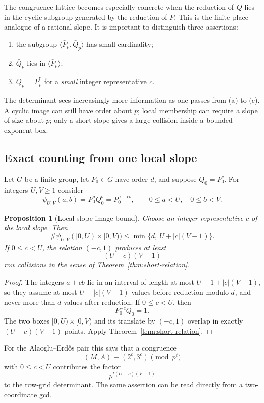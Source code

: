 \documentclass[11pt]{article}
\newtheorem{proposition}[theorem]{Proposition}
\theoremstyle{definition}
\theoremstyle{remark}
\begin{document}
The congruence lattice becomes especially concrete when the reduction of $Q$ lies in the cyclic subgroup generated by the reduction of $P$.  This is the finite-place analogue of a rational slope.  It is important to distinguish three assertions:
\begin{enumerate}[label=\textup{(\alph*)}]
\item the subgroup $\langle\bar P_p,\bar Q_p\rangle$ has small cardinality;
\item $\bar Q_p$ lies in $\langle\bar P_p\rangle$;
\item $\bar Q_p=\bar P_p^c$ for a \emph{small} integer representative $c$.
\end{enumerate}
The determinant sees increasingly more information as one passes from (a) to (c).  A cyclic image can still have order about $p$; local membership can require a slope of size about $p$; only a short slope gives a large collision inside a bounded exponent box.

\subsection{Exact counting from one local slope}

Let $G$ be a finite group, let $P_0\in G$ have order $d$, and suppose $Q_0=P_0^c$.  For integers $U,V\ge1$ consider
\[
 \psi_{U,V}(a,b)=P_0^aQ_0^b=P_0^{a+cb},
 \qquad 0\le a<U,\quad 0\le b<V.
\]

\begin{proposition}[Local-slope image bound]
\label{prop:slope-image}
Choose an integer representative $c$ of the local slope.  Then
\[
 \#\psi_{U,V}([0,U)\times[0,V))
 \le \min\{d,\ U+|c|(V-1)\}.
\]
If $0\le c<U$, the relation $(-c,1)$ produces at least
\[
 (U-c)(V-1)
\]
row collisions in the sense of Theorem~\ref{thm:short-relation}.
\end{proposition}

\begin{proof}
The integers $a+cb$ lie in an interval of length at most $U-1+|c|(V-1)$, so they assume at most $U+|c|(V-1)$ values before reduction modulo $d$, and never more than $d$ values after reduction.  If $0\le c<U$, then
\[
 P_0^{-c}Q_0=1.
\]
The two boxes $[0,U)\times[0,V)$ and its translate by $(-c,1)$ overlap in exactly $(U-c)(V-1)$ points.  Apply Theorem~\ref{thm:short-relation}.
\end{proof}

For the Alaoglu--Erd\H{o}s pair this says that a congruence
\[
 (M,A)\equiv(2^c,3^c)\pmod {p^t}
\]
with $0\le c<U$ contributes the factor
\[
 p^{t(U-c)(V-1)}
\]
to the row-grid determinant.  The same assertion can be read directly from a two-coordinate gcd.
\end{document}
